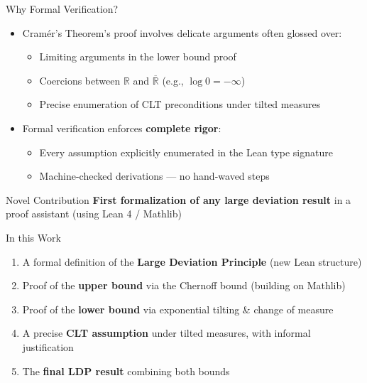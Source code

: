 \documentclass[aspectratio=169]{beamer}
\newcommand{\R}{\mathbb{R}}
\begin{document}
\begin{frame}{Why Formal Verification?}
  \begin{itemize}
    \item Cram\'er's Theorem's proof involves delicate arguments often glossed over:
      \begin{itemize}
        \item Limiting arguments in the lower bound proof
        \item Coercions between $\R$ and $\overline{\R}$ (e.g., $\log 0 = -\infty$)
        \item Precise enumeration of CLT preconditions under tilted measures
      \end{itemize}
      \vspace{0.3cm}
    \item Formal verification enforces \textbf{complete rigor}:
      \begin{itemize}
        \item Every assumption explicitly enumerated in the Lean type signature
        \item Machine-checked derivations --- no hand-waved steps
      \end{itemize}
  \end{itemize}
  \vspace{0.3cm}
  \begin{alertblock}{Novel Contribution}
    \textbf{First formalization of any large deviation result} in a proof assistant (using Lean 4 / Mathlib)
  \end{alertblock}
\end{frame}

\begin{frame}{In this Work}
  \begin{enumerate}
    \item A formal definition of the \textbf{Large Deviation Principle} (new Lean structure)
    \item Proof of the \textbf{upper bound} via the Chernoff bound (building on Mathlib)
    \item Proof of the \textbf{lower bound} via exponential tilting \& change of measure
    \item A precise \textbf{CLT assumption} under tilted measures, with informal justification
    \item The \textbf{final LDP result} combining both bounds
  \end{enumerate}
\end{frame}
\end{document}

